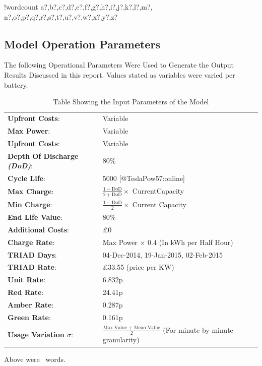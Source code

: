\documentclass[fontsize=9.5pt]{extarticle}
\numberwithin{figure}{section} %
\newcounter{words}
\newenvironment{counted}{%
  \setcounter{words}{0}
  \SearchList!{wordcount}{\stepcounter{words}}
    {a?,b?,c?,d?,e?,f?,g?,h?,i?,j?,k?,l?,m?,
    n?,o?,p?,q?,r?,s?,t?,u?,v?,w?,x?,y?,z?}
  \UndoBoundary{'}
  \SearchOrder{p;}}{%
  \StopSearching}
\begin{document}
\begin{counted}
\subsection{Model Operation
Parameters}\label{model-operation-parameters}

The following Operational Parameters Were Used to Generate the Output
Results Discussed in this report. Values stated as variables were varied
per battery.

\begin{table}[H]
\begin{tabular}{p{4.3cm}p{8cm}}
\textbf{Upfront Costs}:& Variable\\
\textbf{Max Power}:& Variable\\
\textbf{Upfront Costs}:& Variable\\
\textbf{Depth Of Discharge \textit{(DoD)}}:& 80\% \\
\textbf{Cycle Life}:& 5000 [@TeslaPow57:online]\\
\textbf{Max Charge}:& $\frac{1-\text{DoD}}{2+\text{DoD}} \times$ CurrentCapacity\\
\textbf{Min Charge}:& $\frac{1-\text{DoD}}{2} \times$ Current Capacity\\
\textbf{End Life Value}:& 80\%\\
\textbf{Additional Costs}:& £0 \\
\textbf{Charge Rate}:& Max Power $\times$ 0.4 (In kWh per Half Hour)\\
\textbf{TRIAD Days}:& 04-Dec-2014, 19-Jan-2015, 02-Feb-2015\\
\textbf{TRIAD Rate}:& £33.55  (price per KW)\\
\textbf{Unit Rate}:&  6.832p\\
\textbf{Red Rate}:&  24.41p\\
\textbf{Amber Rate}:&  0.287p\\
\textbf{Green Rate}:&  0.161p\\
\textbf{Usage Variation $\sigma$}:&  $\frac{\text{Max Value + Mean Value}}{2}$ (For minute by minute granularity)
\end{tabular}
\label{inputparam}
\caption{Table Showing the Input Parameters of the Model}
\end{table}
\end{counted} %
Above were \thewords\ words. %
\newpage

% 

\printbibliography
\end{document}
